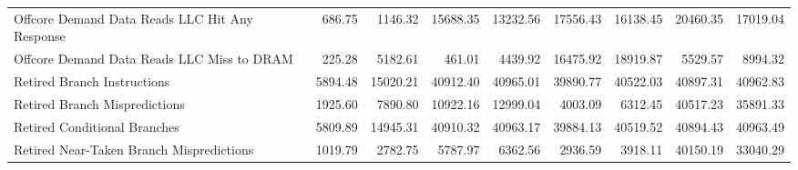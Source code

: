 \begin{table}
\begin{tabular}{lrrrrrrrr}
Offcore Demand Data Reads LLC Hit Any Response & 686.75 & 1146.32 & 15688.35 & 13232.56 & 17556.43 & 16138.45 & 20460.35 & 17019.04 \\
Offcore Demand Data Reads LLC Miss to DRAM & 225.28 & 5182.61 & 461.01 & 4439.92 & 16475.92 & 18919.87 & 5529.57 & 8994.32 \\
Retired Branch Instructions & 5894.48 & 15020.21 & 40912.40 & 40965.01 & 39890.77 & 40522.03 & 40897.31 & 40962.83 \\
Retired Branch Mispredictions & 1925.60 & 7890.80 & 10922.16 & 12999.04 & 4003.09 & 6312.45 & 40517.23 & 35891.33 \\
Retired Conditional Branches & 5809.89 & 14945.31 & 40910.32 & 40963.17 & 39884.13 & 40519.52 & 40894.43 & 40963.49 \\
Retired Near-Taken Branch Mispredictions & 1019.79 & 2782.75 & 5787.97 & 6362.56 & 2936.59 & 3918.11 & 40150.19 & 33040.29 \\
\bottomrule
\end{tabular}
\end{table}
